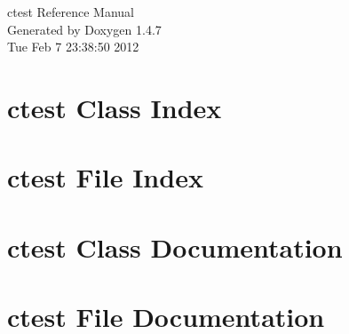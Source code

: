 \documentclass[a4paper]{book}
\begin{document}
\begin{titlepage}
\vspace*{7cm}
\begin{center}
{\Large ctest Reference Manual}\\
\vspace*{1cm}
{\large Generated by Doxygen 1.4.7}\\
\vspace*{0.5cm}
{\small Tue Feb 7 23:38:50 2012}\\
\end{center}
\end{titlepage}
\clearemptydoublepage
{}
\tableofcontents
\clearemptydoublepage
{}
\chapter{ctest Class Index}

\chapter{ctest File Index}

\chapter{ctest Class Documentation}

\chapter{ctest File Documentation}





\printindex
\end{document}
